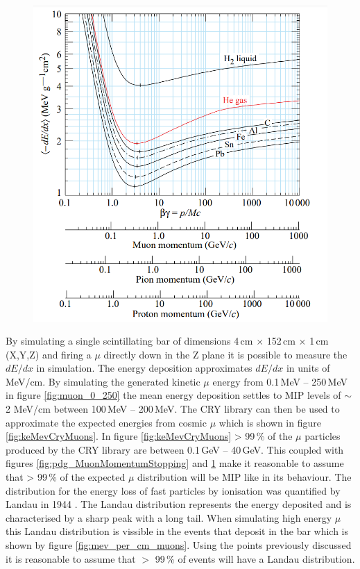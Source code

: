 \begin{figure}[htbp]
 \centering
 \includegraphics[width=0.7\linewidth]{Chapter4/Figs/Raster/pdg_dedx_gcm2.png}
 \label{fig:pdg_dedx_gcm2}
\end{figure}

By simulating a single scintillating bar of dimensions 4\,cm $\times$ 152\,cm $\times$ 1\,cm (X,Y,Z) and firing a $\mu$ directly down in the Z plane it is possible to measure the $dE/dx$ in simulation. The energy deposition approximates $dE/dx$ in units of MeV/cm. By simulating the generated kinetic $\mu$ energy from 0.1\,MeV -- 250\,MeV in figure \ref{fig:muon_0_250} the mean energy deposition settles to MIP levels of $\sim$ 2 MeV/cm between 100\,MeV -- 200\,MeV. The CRY library \cite{ieee_cry_2007} can then be used to approximate the expected energies from cosmic $\mu$ which is shown in figure \ref{fig:keMevCryMuons}. In figure \ref{fig:keMevCryMuons} > 99\,\% of the $\mu$ particles produced by the CRY library are between 0.1\,GeV -- 40\,GeV. This coupled with figures \ref{fig:pdg_MuonMomentumStopping} and \ref{fig:pdg_dedx_gcm2} make it reasonable to assume that > 99\,\% of the expected $\mu$ distribution will be MIP like in its behaviour. The distribution for the energy loss of fast particles by ionisation was quantified by Landau in 1944 \cite{landau1944energy}. The Landau distribution represents the energy deposited and is characterised by a sharp peak with a long tail. When simulating high energy $\mu$ this Landau distribution is vissible in the events that deposit in the bar which is shown by figure \ref{fig:mev_per_cm_muons}. Using the points previously discussed it is reasonable to assume that $>$ 99\,\% of events will have a Landau distribution. %

